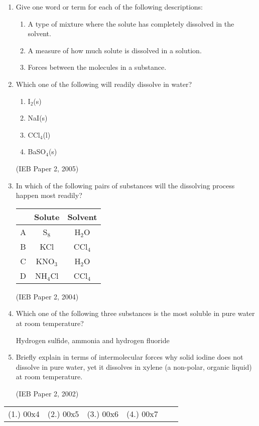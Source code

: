 \begin{eocexercises}{}

\begin{enumerate}
\item{Give one word or term for each of the following descriptions:}
\begin{enumerate}
\item{A type of mixture where the solute has completely dissolved in the solvent.}
\item{A measure of how much solute is dissolved in a solution.}
\item{Forces between the molecules in a substance.}
\end{enumerate}

\item{Which one of the following will readily dissolve in water?}
\begin{enumerate}
\item{I$_{2}$(s)}
\item{NaI(s)}
\item{CCl$_{4}$(l)}
\item{BaSO$_{4}$(s)}
\end{enumerate}

(IEB Paper 2, 2005)

\item{In which of the following pairs of substances will the dissolving process happen most readily?\\}

\begin{tabular}{|c|c|c|}\hline
& \textbf{Solute} & \textbf{Solvent} \\\hline
A & S$_{8}$ & H$_{2}$O \\\hline
B & KCl & CCl$_{4}$ \\\hline
C & KNO$_{3}$ & H$_{2}$O \\\hline
D & NH$_{4}$Cl & CCl$_{4}$ \\\hline
\end{tabular}

(IEB Paper 2, 2004)


\item{Which one of the following three substances is the most soluble in pure water at room temperature?}
\begin{center}
Hydrogen sulfide, ammonia and hydrogen fluoride
\end{center}

\item{Briefly explain in terms of intermolecular forces why solid iodine does not dissolve in pure water, yet it dissolves in xylene (a non-polar, organic liquid) at room temperature.}

(IEB Paper 2, 2002)

\end{enumerate}

\practiceinfo

\begin{tabular}[h]{cccccc}
(1.) 00x4 & (2.) 00x5 & (3.) 00x6 & (4.) 00x7 & 
 \end{tabular}
\end{eocexercises}







